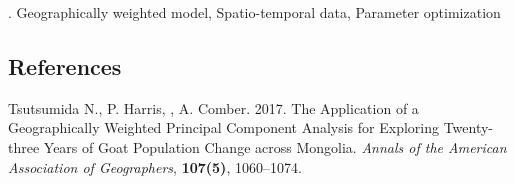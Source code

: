 \documentclass[12pt]{article}
\begin{document}
.
Geographically weighted model, Spatio-temporal data, Parameter optimization


%        
%
%        

\subsection*{References}

\begin{description}

\item
Tsutsumida N., P. Harris, , A. Comber. 2017. The Application of a Geographically Weighted Principal Component Analysis for Exploring Twenty-three Years of Goat Population Change across Mongolia.
\textit{Annals of the American Association of Geographers},
\textbf{107(5)}, 1060--1074.


\end{description}
\end{document}
